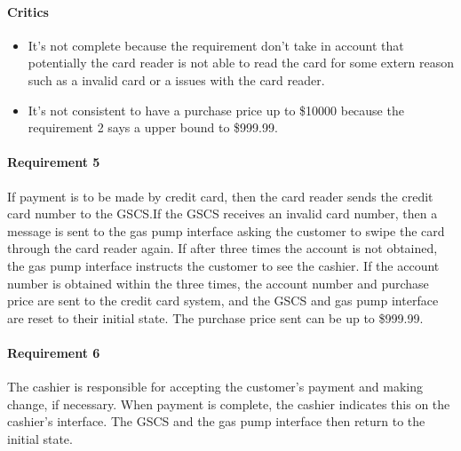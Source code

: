 \documentclass[11pt, a4paper]{article}
\begin{document}
\begin{framed}
    \paragraph{Critics} 
    \begin{itemize}
        \item It's not complete because the requirement don't take in
            account that potentially the card reader is not able to read
            the card for some extern reason such as a invalid card or a
            issues with the card reader.
        \item It's not consistent to have a purchase price up to \$10000
            because the requirement 2 says a upper bound to \$999.99.
    \end{itemize}

    \paragraph{Requirement 5} If payment is to be made by credit card, then the
    card reader sends the credit card number to the GSCS.\@ If the GSCS receives
    an invalid card number, then a message is sent to the gas pump interface
    asking the customer to swipe the card through the card reader again.
    If after three times the account is not obtained, the gas pump
    interface instructs the customer to see the cashier.
    If the account number is obtained within the three times, the
    account number and purchase price are
    sent to the credit card system, and the GSCS and gas pump interface are
    reset to their initial state. The purchase price sent can be up
    to \${}999.99.
\end{framed}

\paragraph{Requirement 6} The cashier is responsible for accepting the
customer's payment and making change, if necessary. When payment is
complete, the cashier indicates this on the cashier's interface. The GSCS
and the gas pump interface then return to the initial state.
\end{document}
